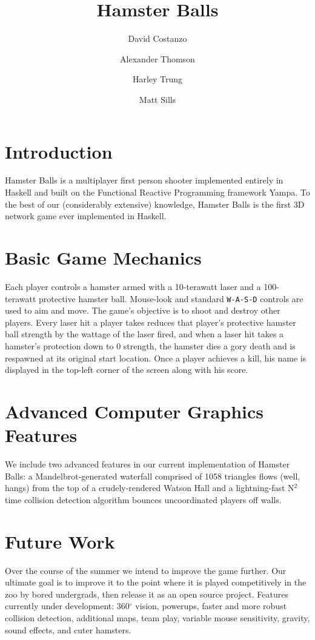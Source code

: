 \documentclass{amsart}
\title{Hamster Balls}
\author{David Costanzo}
\author{Alexander Thomson}
\author{Harley Trung}
\author{Matt Sills}
\begin{document}
\pagestyle{empty}
\maketitle

\section*{Introduction}
\noindent
Hamster Balls is a multiplayer first person shooter implemented entirely in Haskell and
built on the Functional Reactive Programming framework Yampa. To the best of
our (considerably extensive) knowledge, Hamster Balls is the first 3D network game ever
implemented in Haskell. 

\section*{Basic Game Mechanics}
\noindent
Each player controls a hamster armed with a 10-terawatt laser and a
100-terawatt protective hamster ball. Mouse-look and standard \texttt{W-A-S-D} controls are used
to aim and move. The game's objective is to shoot and destroy other players. Every laser
hit a player takes reduces that player's protective hamster ball strength by the wattage
of the laser fired, and when a laser hit takes a hamster's protection down to 0 strength,
the hamster dies a gory death and is respawned at its original start location. Once
a player achieves a kill, his name is displayed in the top-left corner of the screen along
with his score.

\section*{Advanced Computer Graphics Features}
\noindent
We include two advanced features in our current implementation of Hamster Balls:
a Mandelbrot-generated waterfall comprised of 1058 triangles flows (well, hangs)
from the top of a crudely-rendered Watson Hall and a lightning-fast N$^2$ time collision
detection algorithm bounces uncoordinated players off walls.

\section*{Future Work}
\noindent
Over the course of the summer we intend to improve the game further. Our ultimate goal is
to improve it to the point where it is played competitively in the zoo by bored undergrads,
then release it as an open source project. Features currently under development: 360$^{\circ}$
vision, powerups, faster and more robust collision detection, additional maps, team play,
variable mouse sensitivity, gravity, sound effects, and cuter hamsters.
\end{document}
